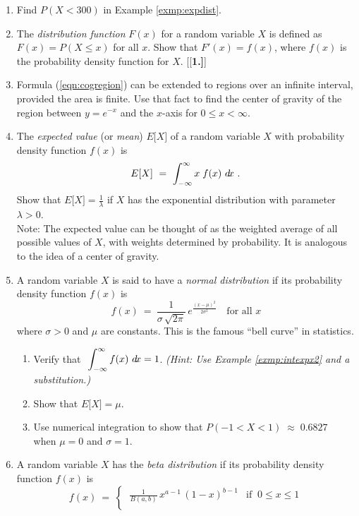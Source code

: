 {\begin{enumerate}[\bfseries 1.]
  function $f(x)$ in formula (\ref{eqn:expdist}) in Example \ref{exmp:expdist}
  for all $\lambda > 0$.
 \item Find $P(X < 300)$ in Example \ref{exmp:expdist}.
 \item The \emph{distribution function} $F(x)$ for a random variable $X$ is
defined as $F(x) = P(X \le x)$ for all $x$. Show that $F'(x) = f(x)$, where
$f(x)$ is the probability density function for $X$.
[{[\bfseries 1.]}]
 \item Formula (\ref{eqn:cogregion}) can be extended
  to regions over an infinite interval, provided the area is finite. Use that
  fact to find the center of gravity of the region between $y=e^{-x}$ and the
  $x$-axis for $0\le x<\infty$.
 \item The \emph{expected value} (or \emph{mean}) $E\lbrack X\rbrack$ of a
  random variable $X$ with probability density function $f(x)$ is
\[
E\lbrack X\rbrack ~=~ \int_{-\infty}^{\infty} x\;f(x)~d\!x ~.
\]
Show that $E\lbrack X\rbrack = \frac{1}{\lambda}$ if $X$ has the exponential
distribution with parameter $\lambda >0$.\\Note: The expected value can be
thought of as the weighted average of all possible values of $X$, with weights
determined by probability. It is analogous to the idea of a center of gravity.
 \item\label{exer:normdist} A random variable $X$ is said to have a
  \emph{normal distribution} if its
  probability density function $f(x)$ is
\[
f(x) ~=~ \frac{1}{\sigma\,\sqrt{2\pi}}\,e^{\frac{(x-\mu)^2}{2\sigma^2}}
\quad\text{for all $x$}
\]
where $\sigma > 0$ and $\mu$ are constants. This is the famous ``bell curve'' in
statistics.
\begin{enumerate}[\bfseries (a)]
\item Verify that $~\displaystyle\int_{-\infty}^{\infty} f(x)~d\!x = 1$.
\emph{(Hint: Use Example \ref{exmp:intexpx2} and a substitution.)}
\item Show that $E\lbrack X\rbrack = \mu$.
\item Use numerical integration to show that $P(-1 < X < 1)\;\approx\; 0.6827\;$
 when $\mu=0$ and $\sigma=1$.
\end{enumerate}
 \item A random variable $X$ has the \emph{beta distribution} if its probability
  density function $f(x)$ is
\[
f(x) ~=~ \begin{cases} ~\frac{1}{B(a,b)}\,x^{a-1}\,(1-x)^{b-1} & \text{if $~0\le x\le 1$}\\

\end{cases}\]
\end{enumerate}}
